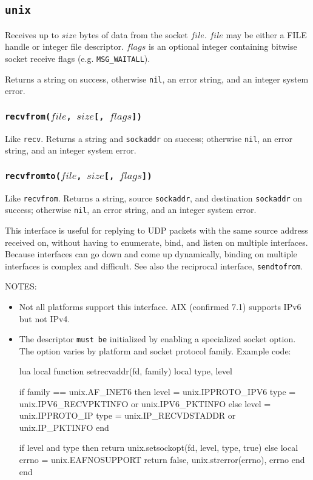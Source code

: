 \documentclass[11pt, oneside]{memoir}
\newcommand*{\nil}[0]{\texttt{nil}\xspace}
\newcommand*{\syscall}[1]{\texttt{#1}\xspace}
\newcommand*{\fn}[1]{\texttt{#1}\xspace}
\newcommand*{\otherwise}[1]{otherwise #1, an error string, and an integer system error}
\newcommand*{\sockaddr}[0]{\texttt{sockaddr}\xspace}
\newcommand*{\mustbe}[0]{\texttt{must be}\xspace}
\newcounter{toccols}
\newenvironment{Module}[1]{
	\subsection{\texttt{#1}}
	\addtocontents{toc}{
		\protect\begin{multicols}{\value{toccols}}
	}
}{
	\addtocontents{toc}{\protect\end{multicols}}
}
\begin{document}
\begin{Module}{unix}
Receives up to $size$ bytes of data from the socket $file$. $file$ may be either a FILE handle or integer file descriptor. $flags$ is an optional integer containing bitwise socket receive flags (e.g. \texttt{MSG\_WAITALL}).

Returns a string on success, \otherwise{\nil}.

\subsubsection[\fn{recvfrom}]{\fn{recvfrom($file$, $size$[, $flags$])}}

Like \syscall{recv}. Returns a string and \sockaddr on success; \otherwise{\nil}.

\subsubsection[\fn{recvfromto}]{\fn{recvfromto($file$, $size$[, $flags$])}}

Like \syscall{recvfrom}. Returns a string, source \sockaddr, and destination \sockaddr on success; \otherwise{\nil}.

This interface is useful for replying to UDP packets with the same source address received on, without having to enumerate, bind, and listen on multiple interfaces. Because interfaces can go down and come up dynamically, binding on multiple interfaces is complex and difficult. See also the reciprocal interface, \syscall{sendtofrom}.

NOTES:
\begin{itemize}
\item Not all platforms support this interface. AIX (confirmed 7.1) supports IPv6 but not IPv4.
\item The descriptor \mustbe initialized by enabling a specialized socket option. The option varies by platform and socket protocol family. Example code:
\begin{example}{lua}
local function setrecvaddr(fd, family)
  local type, level

  if family == unix.AF_INET6 then
    level = unix.IPPROTO_IPV6
    type = unix.IPV6_RECVPKTINFO or unix.IPV6_PKTINFO
  else
    level = unix.IPPROTO_IP
    type = unix.IP_RECVDSTADDR or unix.IP_PKTINFO
  end

  if level and type then
    return unix.setsockopt(fd, level, type, true)
  else
    local errno = unix.EAFNOSUPPORT
    return false, unix.strerror(errno), errno
  end
end
\end{example}
\end{itemize}


\end{Module}
\end{document}
